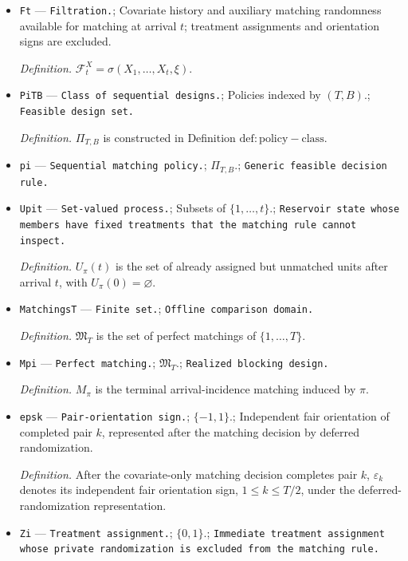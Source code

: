 \documentclass{article}
\begin{document}
\begin{itemize}
  \par\smallskip\noindent\emph{Definition.} \(\xi\) randomizes matching choices but carries no outcome or treatment-sign information.
  \item \texttt{Ft} --- \texttt{Filtration.}; Covariate history and auxiliary matching randomness available for matching at arrival \(t\); treatment assignments and orientation signs are excluded.
  \par\smallskip\noindent\emph{Definition.} \(\mathcal F_t^X=\sigma(X_1,\ldots,X_t,\xi)\).
  \item \texttt{PiTB} --- \texttt{Class of sequential designs.}; Policies indexed by \((T,B)\).; \texttt{Feasible design set.}
  \par\smallskip\noindent\emph{Definition.} \(\Pi_{T,B}\) is constructed in Definition \(\mathrm{def:policy-class}\).
  \item \texttt{pi} --- \texttt{Sequential matching policy.}; \(\Pi_{T,B}\).; \texttt{Generic feasible decision rule.}
  \item \texttt{Upit} --- \texttt{Set-\allowbreak{}valued process.}; Subsets of \(\{1,\ldots,t\}\).; \texttt{Reservoir state whose members have fixed treatments that the matching rule cannot inspect.}
  \par\smallskip\noindent\emph{Definition.} \(U_\pi(t)\) is the set of already assigned but unmatched units after arrival \(t\), with \(U_\pi(0)=\varnothing\).
  \item \texttt{MatchingsT} --- \texttt{Finite set.}; \texttt{Offline comparison domain.}
  \par\smallskip\noindent\emph{Definition.} \(\mathfrak M_T\) is the set of perfect matchings of \(\{1,\ldots,T\}\).
  \item \texttt{Mpi} --- \texttt{Perfect matching.}; \(\mathfrak M_T\).; \texttt{Realized blocking design.}
  \par\smallskip\noindent\emph{Definition.} \(M_\pi\) is the terminal arrival-incidence matching induced by \(\pi\).
  \item \texttt{epsk} --- \texttt{Pair-\allowbreak{}orientation sign.}; \(\{-1,1\}\).; Independent fair orientation of completed pair \(k\), represented after the matching decision by deferred randomization.
  \par\smallskip\noindent\emph{Definition.} After the covariate-only matching decision completes pair \(k\), \(\varepsilon_k\) denotes its independent fair orientation sign, \(1\le k\le T/2\), under the deferred-randomization representation.
  \item \texttt{Zi} --- \texttt{Treatment assignment.}; \(\{0,1\}\).; \texttt{Immediate treatment assignment whose private randomization is excluded from the matching rule.}

\end{itemize}
\end{document}
